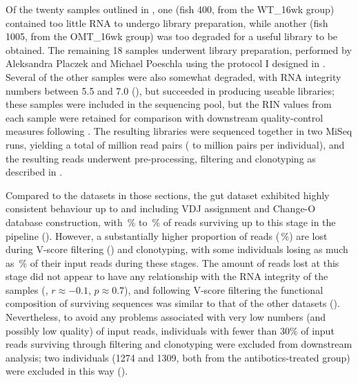 Of the twenty samples outlined in , one (fish 400, from the WT\_16wk group) contained too little RNA to undergo \igseq library preparation, while another (fish 1005, from the OMT\_16wk group) was too degraded for a useful library to be obtained. The remaining 18 samples underwent \igseq library preparation, performed by Aleksandra Placzek and Michael Poeschla using the protocol I designed in . Several of the other samples were also somewhat degraded, with RNA integrity numbers between 5.5 and 7.0 (), but succeeded in producing useable libraries; these samples were included in the sequencing pool, but the RIN values from each sample were retained for comparison with downstream quality-control measures following \Igseq. The resulting libraries were sequenced together in two MiSeq runs, yielding a total of  million read pairs ( to  million pairs per individual), and the resulting reads underwent pre-processing, filtering and clonotyping as described in .

Compared to the datasets in those sections, the gut dataset exhibited highly consistent behaviour up to and including VDJ assignment and Change-O database construction, with \,\% to \,\% of reads surviving up to this stage in the pipeline (). However, a substantially higher proportion of reads (\,\%) are lost during V-score filtering () and clonotyping, with some individuals losing as much as \,\% of their input reads during these stages. The amount of reads lost at this stage did not appear to have any relationship with the RNA integrity of the samples (, $r \approx -0.1$, $p \approx 0.7$), and following V-score filtering the functional composition of surviving sequences was similar to that of the other datasets (). Nevertheless, to avoid any problems associated with very low numbers (and possibly low quality) of input reads, individuals with fewer than 30\% of input reads surviving through filtering and clonotyping were excluded from downstream analysis; two individuals (1274 and 1309, both from the antibotics-treated group) were excluded in this way ().

